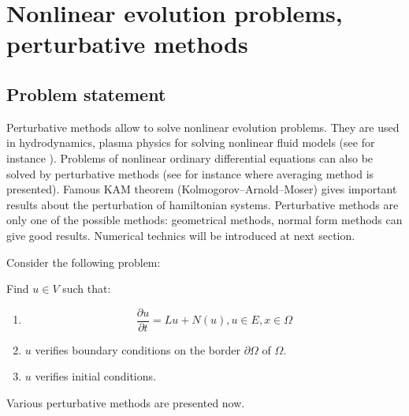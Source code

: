 \documentclass[12pt]{book}
\begin{document}
\section{Nonlinear evolution problems, perturbative
  methods}\label{partprobevolnl} 
\subsection{Problem statement}
Perturbative methods allow to solve nonlinear evolution problems. They are
used in hydrodynamics, plasma physics for solving nonlinear fluid models (see
for instance \cite{ph:plasm:Chen84}). 
Problems of nonlinear ordinary differential equations can also be solved by
perturbative methods (see for instance \cite{ma:equad:Arnold83} where
averaging method is presented).  
Famous KAM theorem (Kolmogorov--Arnold--Moser) gives important results about
the perturbation of hamiltonian systems. 
Perturbative methods are only one of the possible methods: geometrical
methods, normal form methods
\cite{ma:equad:Arnold83} can give good results. Numerical technics will be
introduced at next section.

Consider the following problem:
\begin{prob}\label{proeqp} 
Find $u\in V$ such that:
\begin{enumerate}
\item 
\begin{equation}
\frac{\partial u}{\partial t}=Lu+N(u), u\in E, x\in\Omega
\end{equation}
\item $u$ verifies boundary conditions on the border
$\partial 
\Omega$ of $\Omega$.
\item $u$ verifies initial conditions.
\end{enumerate}
\end{prob}
Various perturbative methods are presented now.
\end{document}
